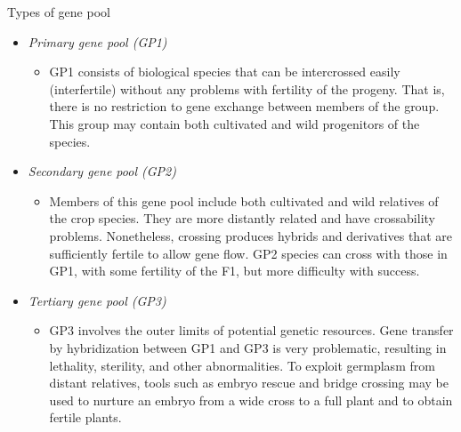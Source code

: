\documentclass[11pt,ignorenonframetext,aspectratio=169]{beamer}
\providecommand{\tightlist}{%
  \setlength{\itemsep}{0pt}\setlength{\parskip}{0pt}}
\begin{document}
\begin{frame}{Types of gene pool}
\protect\hypertarget{types-of-gene-pool}{}
\begin{itemize}
\tightlist
\item
  \emph{Primary gene pool (GP1)}

  \begin{itemize}
  \tightlist
  \item
    GP1 consists of biological species that can be intercrossed easily
    (interfertile) without any problems with fertility of the progeny.
    That is, there is no restriction to gene exchange between members of
    the group. This group may contain both cultivated and wild
    progenitors of the species.
  \end{itemize}
\item
  \emph{Secondary gene pool (GP2)}

  \begin{itemize}
  \tightlist
  \item
    Members of this gene pool include both cultivated and wild relatives
    of the crop species. They are more distantly related and have
    crossability problems. Nonetheless, crossing produces hybrids and
    derivatives that are sufficiently fertile to allow gene flow. GP2
    species can cross with those in GP1, with some fertility of the F1,
    but more difficulty with success.
  \end{itemize}
\end{itemize}
\end{frame}

\begin{frame}{}
\protect\hypertarget{section-4}{}
\begin{itemize}
\tightlist
\item
  \emph{Tertiary gene pool (GP3)}

  \begin{itemize}
  \tightlist
  \item
    GP3 involves the outer limits of potential genetic resources. Gene
    transfer by hybridization between GP1 and GP3 is very problematic,
    resulting in lethality, sterility, and other abnormalities. To
    exploit germplasm from distant relatives, tools such as embryo
    rescue and bridge crossing may be used to nurture an embryo from a
    wide cross to a full plant and to obtain fertile plants.
  \end{itemize}
\end{itemize}
\end{frame}
\end{document}
